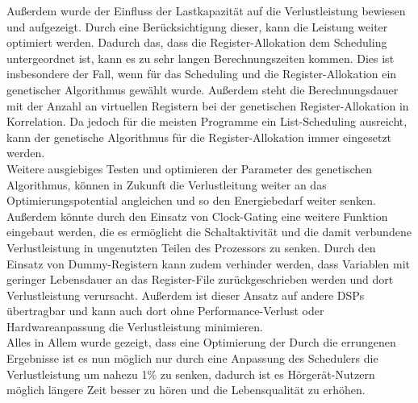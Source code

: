 Außerdem wurde der Einfluss der Lastkapazität auf die Verlustleistung bewiesen und aufgezeigt. Durch eine Berücksichtigung dieser, kann die Leistung weiter optimiert werden.
Dadurch das, dass die Register-Allokation dem Scheduling untergeordnet ist, kann es zu sehr langen Berechnungszeiten kommen. Dies ist insbesondere der Fall, wenn für das Scheduling und die Register-Allokation ein genetischer Algorithmus gewählt wurde. Außerdem steht die Berechnungsdauer mit der Anzahl an virtuellen Registern bei der genetischen Register-Allokation in Korrelation. Da jedoch für die meisten Programme ein List-Scheduling ausreicht, kann der genetische Algorithmus für die Register-Allokation immer eingesetzt werden.\\
Weitere ausgiebiges Testen und optimieren der Parameter des genetischen Algorithmus, können in Zukunft die Verlustleitung weiter an das Optimierungspotential angleichen und so den Energiebedarf weiter senken. Außerdem könnte durch den Einsatz von Clock-Gating eine weitere Funktion eingebaut werden, die es ermöglicht die Schaltaktivität und die damit verbundene Verlustleistung in ungenutzten Teilen des Prozessors zu senken. Durch den Einsatz von Dummy-Registern kann zudem verhinder werden, dass Variablen mit geringer Lebensdauer an das Register-File zurückgeschrieben werden und dort Verlustleistung verursacht. Außerdem ist dieser Ansatz auf andere DSPs übertragbar und kann auch dort ohne Performance-Verlust oder Hardwareanpassung die Verlustleistung minimieren.\\
Alles in Allem wurde gezeigt, dass eine Optimierung der 
Durch die errungenen Ergebnisse ist es nun möglich nur durch eine Anpassung des Schedulers die Verlustleistung um nahezu 1\% zu senken, dadurch ist es Hörgerät-Nutzern möglich längere Zeit besser zu hören und die Lebensqualität zu erhöhen.\\
%


